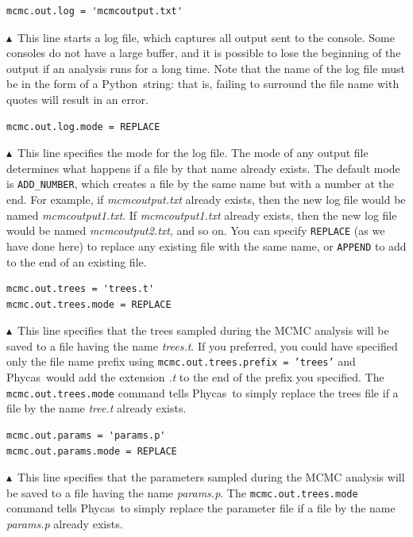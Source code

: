\documentclass[10pt]{article}
\newcommand{\pathname}[1]{{\em #1}}				%
\newcommand{\code}[1]{{\tt #1}}					%
\newcommand{\python}{{\sc Python}\index{Python}}
\newcommand{\phycas}{{\sc Phycas}\index{Phycas}}
\newcommand{\pointup}{$\blacktriangle$}
\begin{document}
\begin{samepage}
\begin{verbatim}
mcmc.out.log = 'mcmcoutput.txt'
\end{verbatim}
\pointup\ This line starts a log file, which captures all output sent to the console. Some consoles do not have a large buffer, and it is possible to lose the beginning of the output if an analysis runs for a long time. Note that the name of the log file must be in the form of a \python\ string: that is, failing to surround the file name with quotes will result in an error.
\end{samepage}

\begin{samepage}
\begin{verbatim}
mcmc.out.log.mode = REPLACE
\end{verbatim}
\pointup\ This line specifies the mode for the log file. The mode of any output file determines what happens if a file by that name already exists. The default mode is \code{ADD\_NUMBER}, which creates a file by the same name but with a number at the end. For example, if \pathname{mcmcoutput.txt} already exists, then the new log file would be named \pathname{mcmcoutput1.txt}. If \pathname{mcmcoutput1.txt} already exists, then the new log file would be named \pathname{mcmcoutput2.txt}, and so on. You can specify \code{REPLACE} (as we have done here) to replace any existing file with the same name, or \code{APPEND} to add to the end of an existing file. 
\end{samepage}

\begin{samepage}
\begin{verbatim}
mcmc.out.trees = 'trees.t'
mcmc.out.trees.mode = REPLACE
\end{verbatim}
\pointup\ This line specifies that the trees sampled during the MCMC analysis will be saved to a file having the name \pathname{trees.t}. If you preferred, you could have specified only the file name prefix using \code{mcmc.out.trees.prefix = 'trees'} and \phycas\ would add the extension \pathname{.t} to the end of the prefix you specified. The \code{mcmc.out.trees.mode} command tells \phycas\ to simply replace the trees file if a file by the name \pathname{tree.t} already exists.
\end{samepage}

\begin{samepage}
\begin{verbatim}
mcmc.out.params = 'params.p'
mcmc.out.params.mode = REPLACE
\end{verbatim}
\pointup\ This line specifies that the parameters sampled during the MCMC analysis will be saved to a file having the name \pathname{params.p}. The \code{mcmc.out.trees.mode} command tells \phycas\ to simply replace the parameter file if a file by the name \pathname{params.p} already exists. 
\end{samepage}
\end{document}
